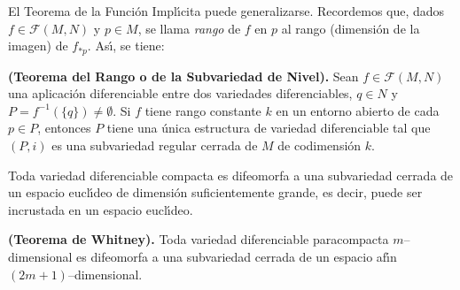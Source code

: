 \documentclass[cursovd_portada.tex]{subfiles}
\begin{document}
\newpage

El Teorema de la Funci\'on Impl\'{\i}cita puede generalizarse.
Recordemos que, dados $f\in \mathcal{F}(M,N)$ y $p \in M$, se
llama {\it rango} de $f$ en $p$ al rango (dimensi\'on de la
imagen) de $f_{*p}$. As\'{\i}, se tiene:

\begin{teorema}
{\bf (Teorema del Rango o de la Subvariedad de Nivel).} Sean
$f\in\mathcal{F}(M,N)$ una aplicaci\'{o}n diferenciable entre dos
variedades diferenciables, $q\in N$ y
$P=f^{-1}(\{q\})\neq\emptyset$. Si $f$ tiene rango constante $k$
en un entorno abierto de cada $p\in P$, entonces $P$ tiene una
\'{u}nica estructura de variedad diferenciable tal que $(P,i)$ es
una subvariedad regular cerrada de $M$ de codimensi\'{o}n $k$.
\end{teorema}

\begin{teorema}
Toda variedad diferenciable compacta es difeomorfa a una subvariedad cerrada de un espacio eucl\'{\i}deo de dimensi\'{o}n
suficientemente grande, es decir, puede ser incrustada en un espacio eucl\'{\i}deo.
\end{teorema}
\begin{teorema}
{\bf (Teorema de Whitney).} Toda variedad diferenciable paracompacta $m$--dimensional es difeomorfa a una
subvariedad cerrada de un espacio af\'{\i}n $(2m+1)$--dimensional.
\end{teorema}
\end{document}
